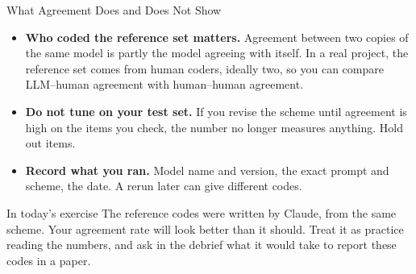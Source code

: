 \documentclass[aspectratio=169, 11pt]{beamer}
\begin{document}
\begin{frame}{What Agreement Does and Does Not Show}
  \begin{itemize}
    \item \textbf{Who coded the reference set matters.} Agreement between two copies of the same model is partly the model agreeing with itself. In a real project, the reference set comes from human coders, ideally two, so you can compare LLM--human agreement with human--human agreement.
    \item \textbf{Do not tune on your test set.} If you revise the scheme until agreement is high on the items you check, the number no longer measures anything. Hold out items.
    \item \textbf{Record what you ran.} Model name and version, the exact prompt and scheme, the date. A rerun later can give different codes.
  \end{itemize}

  \vspace{0.6em}
  \begin{block}{In today's exercise}
    The reference codes were written by Claude, from the same scheme. Your agreement rate will look better than it should. Treat it as practice reading the numbers, and ask in the debrief what it would take to report these codes in a paper.
  \end{block}
\end{frame}


\end{document}
